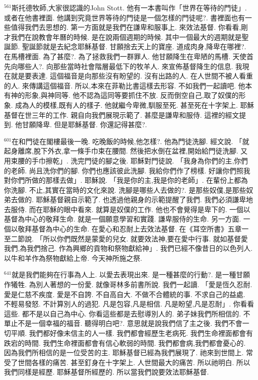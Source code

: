 \documentclass{book}
\begin{document}
$^{561}$斯托德牧師,大家很認識的John Stott.
他有一本書叫作「世界在等待的門徒」.
或者在他書裡面.
他講到究竟世界等待的門徒是一個怎樣的門徒呢?.
書裡面也有一些值得我們去思想的.
第一方面就是我們在謙卑和服事上.
來效法基督.
你看看,剛才我們在說教會年曆的時候.
是在說兩個週期的時候.
其中一個最大的週期就是聖誕節.
聖誕節就是去紀念耶穌基督.
甘願捨去天上的寶座.
道成肉身,降卑在哪裡?.
在馬槽裡面.
為了甚麼?.
為了拯救我們一群罪人.
他甘願降生在卑陋的馬槽.
天使首先向哪些人?.
向那些當時社會階層最低下的牧羊人.
來宣佈基督降生的信息.
我現在就是要表達.
這個福音是向那些沒有盼望的.
沒有出路的人.
在人世間不被人看重的人.
來傳講這個福音.
所以,本來在菲勒比書這樣去形容.
不如我們一起讀吧.
他本有神的形象,與神同等.
他不認為這同等要抓住不放.
反而倒空自己,取了奴僕的形象.
成為人的模樣,既有人的樣子.
他就繼今卑微,馴服至死.
甚至死在十字架上.
耶穌基督在世三年的工作.
親自向我們展現示範了.
甚麼是謙卑和服侍.
這裡的經文提到.
他甘願降卑.
但是耶穌基督.
你還記得甚麼?.

$^{601}$在和門徒在閣樓最後一晚.
吃晚飯的時候,他怎樣?.
他為門徒洗腳.
經文說.
「就起身離席,脫下外衣,拿一條手巾束在腰間.
然後把水倒在盆裡,開始給門徒洗腳.
又用束腰的手巾擦乾」.
洗完門徒的腳之後.
耶穌對門徒說.
「我身為你們的主,你們的老師.
尚且洗你們的腳.
你們也應該彼此洗腳.
我給你們作了榜樣.
好讓你們照我對你們所做的那樣去做」.
耶穌說.
「我是你的主,我是你的老師」.
在輩份上都為你洗腳.
不止,其實在當時的文化來說.
洗腳是哪些人去做的?.
是那些奴僕,是那些奴弟去做的.
耶穌基督親自示範了.
也透過他親身的示範提醒了我們.
我們必須謙卑地去服侍.
而在耶穌的眼中看來.
就算是奴僕的工作.
他也不會覺得是卑下的.
一個以基督為中心的敬拜生命.
就是一個願意學習和實踐.
謙卑服侍的生命.
另一方面.
一個以敬拜基督為中心的生命.
在愛心和忍耐上去效法基督.
在《耳空所書》五章一至二節說.
「所以你們既然是蒙愛的兒女.
就要效法神,要在愛中行事.
就如基督愛我們,為我們捨己.
作為興鄉的貢物和祭物獻給神」.
我們已經不像昔日的以色列人.
以牛和羊作為祭物獻給上帝.
今天神所施之祭.

$^{641}$就是我們能夠在行事為人上.
以愛去表現出來.
是一種甚麼的行動?.
是一種甘願作犧牲.
為別人著想的一份愛.
就像哥林多前書所說.
我們一起讀.
「愛是恆久忍耐.
愛是仁慈不疾度.
愛是不自誇.
不自高自大.
不做不合體統的事.
不求自己的益處.
不輕易發怒.
不計算別人的過犯.
凡是包容,凡是相信.
凡是盼望,凡是忍耐」.
你看看這些.
都不是以自己為中心.
你看這些都是去慰導別人的.
弟子妹我們所相信的.
不單止不是一個幸福的福音.
聽得明白吧?.
意思就是說我們信了主之後.
我們不會一切平順.
我們都好像未信主的人一樣.
我們都會經歷生老病死.
我們生命裡面都會有跌宕的時間.
我們生命裡面都會有信心軟弱的時間.
我們都會病,我們都會憂心的.
因為我們所相信的是一位受苦的主.
耶穌基督已經為我們展現了.
祂來到世間上.
常受了世間各樣的痛苦.
甚至釘身在十字架上.
人世間最大的痛苦.
所以祂明白.
所以我們同樣是經歷.
耶穌基督所經歷的.
所以當我們說要效法耶穌基督.
\end{document}
